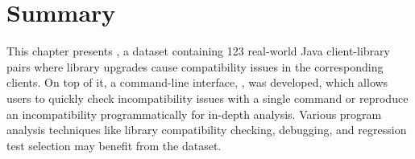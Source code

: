\section{Summary}\label{sec:ch3:summary}
This chapter presents \toolcompsuite, a dataset containing 123 real-world Java client-library pairs where library upgrades cause compatibility issues in the corresponding clients. On top of it, a command-line interface, \runner, was developed, which allows users to quickly check incompatibility issues with a single command or reproduce an incompatibility programmatically for in-depth analysis. Various program analysis techniques like library compatibility checking, debugging, and regression test selection may benefit from the dataset.